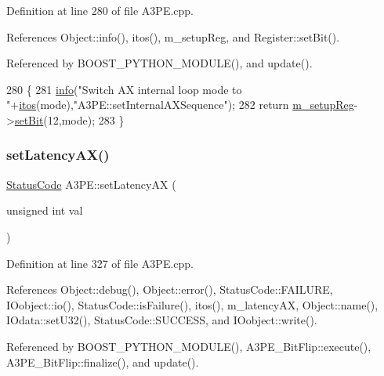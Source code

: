 Definition at line 280 of file A3\+P\+E.\+cpp.



References Object\+::info(), itos(), m\+\_\+setup\+Reg, and Register\+::set\+Bit().



Referenced by B\+O\+O\+S\+T\+\_\+\+P\+Y\+T\+H\+O\+N\+\_\+\+M\+O\+D\+U\+L\+E(), and update().


\begin{DoxyCode}
280                                                \{
281   \hyperlink{classObject_a644fd329ea4cb85f54fa6846484b84a8}{info}(\textcolor{stringliteral}{"Switch AX internal loop mode to "}+\hyperlink{Tools_8h_af330027dbdafb9a30768b3613c553e60}{itos}(mode),\textcolor{stringliteral}{"A3PE::setInternalAXSequence"});
282   \textcolor{keywordflow}{return} \hyperlink{classA3PE_a142fa10b7e705c4701ae21678ec2ec8a}{m\_setupReg}->\hyperlink{classRegister_ab094246dd12aa7e0aa0ca917f4e70b31}{setBit}(12,mode);
283 \}
\end{DoxyCode}
\mbox{\label{classA3PE_a53882e1272e8146e51837904ea00f33c}} 
\subsubsection{\texorpdfstring{set\+Latency\+A\+X()}{setLatencyAX()}}
{\footnotesize\ttfamily \hyperlink{classStatusCode}{Status\+Code} A3\+P\+E\+::set\+Latency\+AX (\begin{DoxyParamCaption}\item[{unsigned int}]{val }\end{DoxyParamCaption})}



Definition at line 327 of file A3\+P\+E.\+cpp.



References Object\+::debug(), Object\+::error(), Status\+Code\+::\+F\+A\+I\+L\+U\+RE, I\+Oobject\+::io(), Status\+Code\+::is\+Failure(), itos(), m\+\_\+latency\+AX, Object\+::name(), I\+Odata\+::set\+U32(), Status\+Code\+::\+S\+U\+C\+C\+E\+SS, and I\+Oobject\+::write().



Referenced by B\+O\+O\+S\+T\+\_\+\+P\+Y\+T\+H\+O\+N\+\_\+\+M\+O\+D\+U\+L\+E(), A3\+P\+E\+\_\+\+Bit\+Flip\+::execute(), A3\+P\+E\+\_\+\+Bit\+Flip\+::finalize(), and update().



